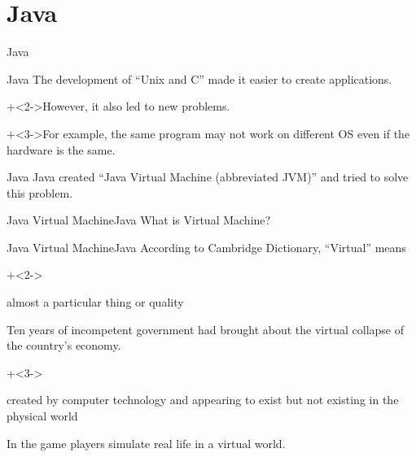 %
%

\section{Java}

\begin{frame}{}{}
    {\Huge Java}
\end{frame}


\begin{frame}{Java}{}
    The development of ``Unix and C'' made it easier to create applications.
    \vspace{4ex}

    \onslide+<2->{However, it also led to new problems.}
    \vspace{4ex}

    \onslide+<3->{For example, the same program may not work on different OS even if the hardware is the same.}
\end{frame}


\begin{frame}{Java}{}
    Java created ``Java Virtual Machine (abbreviated JVM)'' and tried to solve this problem.
\end{frame}


\begin{frame}{Java Virtual Machine}{Java}
    What is Virtual Machine?
\end{frame}


\begin{frame}{Java Virtual Machine}{Java}
    According to Cambridge Dictionary, ``Virtual'' means
    \vspace{4ex}

    \begin{itemize}
        \onslide+<2->{\item almost a particular thing or quality

            {\footnotesize Ten years of incompetent government had brought about the virtual collapse of the country's economy.}}
        \onslide+<3->{\item created by computer technology and appearing to exist but not existing in the physical world

            {\footnotesize In the game players simulate real life in a virtual world.}}
    \end{itemize}
\end{frame}


